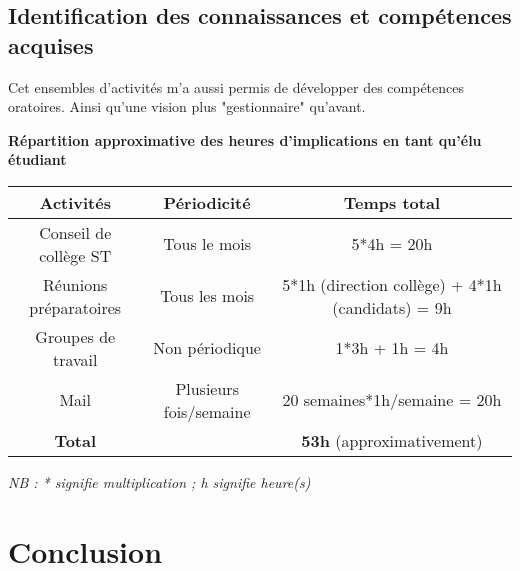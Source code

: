 \documentclass{article}
\begin{document}
\subsection{Identification des connaissances et compétences acquises}



Cet ensembles d'activités m'a aussi permis de développer des compétences oratoires. Ainsi qu'une vision plus "gestionnaire" qu'avant.
\newpage
\begin{center}
\textbf{Répartition approximative des heures d'implications en tant qu'élu étudiant}
\vspace*{10pt}

\begin{tabular}{|c|c|c|}
\hline 
\textbf{Activités} & \textbf{Périodicité} & \textbf{Temps total}\\ 
\hline 
Conseil de collège ST & Tous le mois & 5*4h = 20h \\ 
\hline 
Réunions préparatoires & Tous les mois & 5*1h (direction collège) + 4*1h (candidats) = 9h\\ 
\hline 
Groupes de travail & Non périodique & 1*3h + 1h = 4h\\ 
\hline 
Mail & Plusieurs fois/semaine & 20 semaines*1h/semaine = 20h\\ 
\hline 
\textbf{Total} &  & \textbf{53h} (approximativement) \\ 
\hline 
\end{tabular} 
\end{center}
\textit{NB : * signifie multiplication ; h signifie heure(s)}

\section*{Conclusion}
\end{document}
